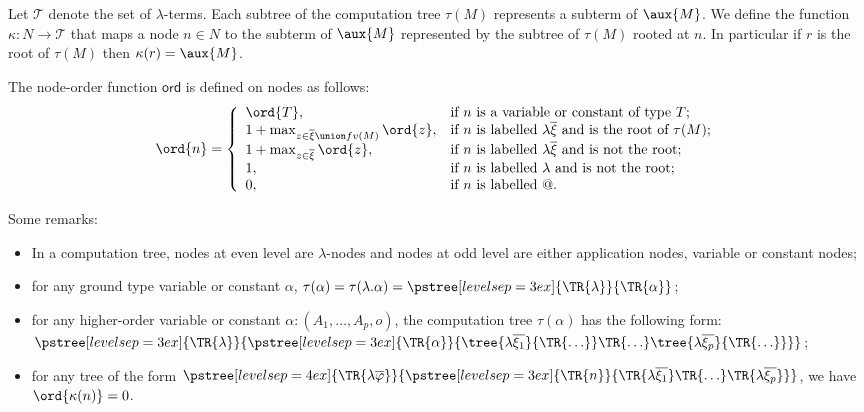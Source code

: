Let $\mathcal{T}$ denote the set of $\lambda$-terms.
Each subtree of the computation tree $\tau(M)$ represents a subterm of $\aux{M}$.
We define the function $\kappa : N \rightarrow \mathcal{T}$ that maps a node $n \in N$ to the subterm of $\aux{M}$
represented by the subtree of $\tau(M)$ rooted at $n$.
In particular if $r$ is the root of $\tau(M)$ then $\kappa(r) = \aux{M}$.

\begin{dfn}
\label{def:nodeorder}
The node-order function $\textsf{ord}$ is defined on nodes as follows:
\begin{eqnarray*}
\ord{n} = \left\{
  \begin{array}{ll}
    \ord{T}, & \hbox{if $n$ is a variable or constant of type $T$;} \\
    1 + \max_{z\in \overline{\xi}\union fv(M)} \ord{z}, & \hbox{if $n$ is labelled $\lambda \overline{\xi}$ and is the root of $\tau(M)$;} \\
    1 + \max_{z\in \overline{\xi}} \ord{z}, & \hbox{if $n$ is labelled $\lambda \overline{\xi}$ and is not the root;} \\
    1, & \hbox{if $n$ is labelled $\lambda$ and is not the root;} \\
    0, & \hbox{if $n$ is labelled @.}
  \end{array}
\right.
\end{eqnarray*}
\end{dfn}

\noindent Some remarks:
\begin{itemize}
\item In a computation tree, nodes at even level are $\lambda$-nodes and nodes at odd level are either application nodes,
variable or constant nodes;

\item for any ground type variable or constant $\alpha$,
$\tau(\alpha) = \tau(\lambda . \alpha) =  \pstree[levelsep=3ex]
    { \TR{\lambda } }
    { \TR{\alpha}
    }$;

\item for any higher-order variable or constant $\alpha : (A_1,\ldots,A_p,o)$, the computation tree $\tau(\alpha)$ has the following form:
$ \pstree[levelsep=3ex]{\TR{\lambda}}
        {\pstree[levelsep=3ex]
                { \TR{\alpha} }
                { \tree{\lambda \overline{\xi_1}}{\TR{\ldots}} \TR{\ldots} \tree{\lambda \overline{\xi_p}}{\TR{\ldots}}
                }
        }
$;

\item for any tree of the form
        $ \pstree[levelsep=4ex]
            { \TR{\lambda \overline{\varphi}} }
            { \pstree[levelsep=3ex]
                {\TR{n}}
                {\TR{\lambda \overline{\xi_1}} \TR{\ldots} \TR{\lambda \overline{\xi_p}}}
            }
        $,
    we have $\ord{\kappa(n)}=0$.

\end{itemize}



